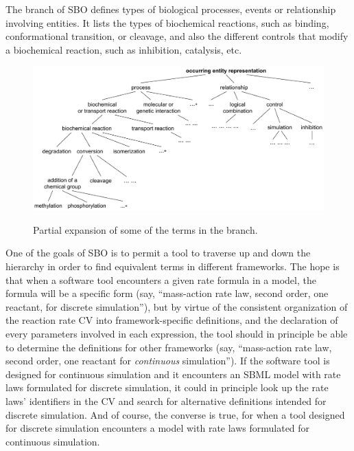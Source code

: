 The \emph{} branch of SBO defines types of biological
processes, events or relationship involving entities.  It lists
the types of biochemical reactions, such as binding,
conformational transition, or cleavage, and also the different
controls that modify a biochemical reaction, such as inhibition,
catalysis, etc.

\begin{figure}[tbh]
  \centering
             {\includegraphics[scale=0.8]{figs/sbo-interaction-l3v2}}
  \caption{Partial expansion of some of the terms in the \emph{} branch.}
  \label{fig:sbo-interaction}
\end{figure}

One of the goals of SBO is to permit a tool to traverse up and
down the hierarchy in order to find equivalent terms in different
frameworks.  The hope is that when a software tool encounters a
given rate formula in a model, the formula will be a specific form
(say, ``mass-action rate law, second order, one reactant, for
discrete simulation''), but by virtue of the consistent
organization of the reaction rate CV into framework-specific
definitions, and the declaration of every parameters involved in
each expression, the tool should in principle be able to determine
the definitions for other frameworks (say, ``mass-action rate law,
second order, one reactant for \emph{continuous} simulation'').
If the software tool is designed for continuous simulation and it
encounters an SBML model with rate laws formulated for discrete
simulation, it could in principle look up the rate laws'
identifiers in the CV and search for alternative definitions
intended for discrete simulation.  And of course, the converse is
true, for when a tool designed for discrete simulation encounters
a model with rate laws formulated for continuous simulation.

